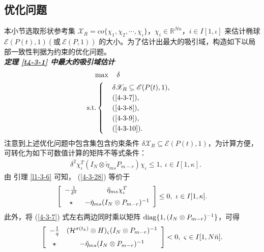 \subsection{优化问题}
 本小节选取形状参考集 $\mathscr{X}_R=co\{\chi_1,\chi_2,\cdots,\chi_\iota\}$，$\chi_i\in\mathbb{R }^{Nn}$，$i\in I[1,\iota]$ 来估计椭球 $\mathscr{E}( P(t),1) (\text{或}\ \mathscr{E}( P ,1))$ 的大小。为了估计出最大的吸引域，构造如下以局部一致性判据为约束的优化问题。\\ 
\textbf{\textit{ 定理 \ref{t4-3-1} 中最大的吸引域估计  }}
\begin{align}\label{4-3-27}
&\quad\max\quad  \delta\\
&{\rm s.t.} 
\begin{cases}  
\quad\delta \mathscr{X}_R\subseteq \mathscr{E}( P(t),1), \\
\quad(\ref{4-3-7}), \\
\quad(\ref{4-3-8}), \\
\quad(\ref{4-3-9}), \\
\quad(\ref{4-3-10}).\nonumber
\end{cases}
\end{align}
注意到上述优化问题中包含集包含约束条件  $\delta \mathscr{X}_R\subseteq \mathscr{E}( P(t),1)$，为计算方便，可转化为如下可数值计算的矩阵不等式条件： 
\begin{align} \label{4-3-28}
\quad\delta^2\chi^T_\iota(I_N\otimes \check{\eta}_{ms} P_{m-r}) \chi_\iota\leq 1,\ \iota\in I[1,\kappa].\end{align}
由 引理 \ref{l1-3-6} 可知， (\ref{4-3-28}) 等价于  
\begin{align*}
\left[ \begin{array}{cc}-\frac{1}{\delta^2} &\check{\eta}_{ms}  \chi^T_\iota  \vspace{0.2cm}\\
\star &-\check{\eta}_{ms} (I_N\otimes P_{m-r})^{-1}\\ 
\end{array}\right]\leq0,\ \iota\in I[1,\kappa].
\end{align*}
此外，将 (\ref{4-3-7}) 式左右两边同时乘以矩阵 ${\rm diag}\{1,(I_N\otimes P_{m-r})^{-1}\}$，可得
\begin{align*} 
\left[ \begin{array}{cc}
-\frac{1}{q}&  (\mathcal{H}^{\sigma(t_k)}\otimes H)_\varsigma (I_N\otimes P_{m-r})^{-1}\vspace{0.2cm}\\
\star&-\check{\eta}_{ms}(I_N\otimes P_{m-r} )^{-1} \\
\end{array}
\right]< 0,\ \varsigma\in I[1,N\bar{n}].
\end{align*}
